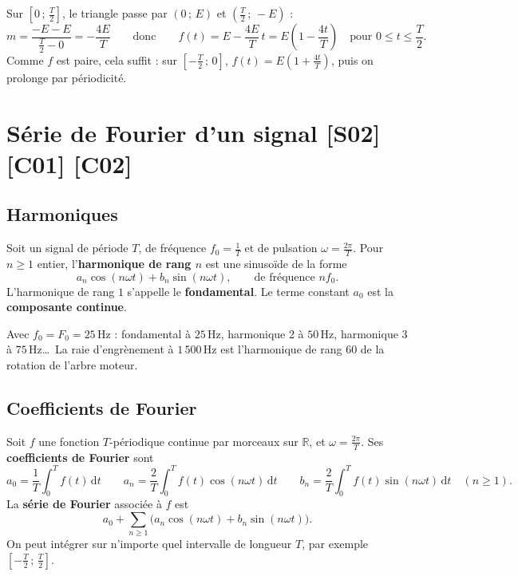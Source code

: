 \documentclass[a4paper,11pt]{article}
\begin{document}
\begin{exemple}\label{ex:triangleexpr}
Sur $\left[0\,;\,\frac T2\right]$, le triangle passe par $(0\,;\,E)$ et $\left(\frac T2\,;\,-E\right)$ :
\[
m = \frac{-E - E}{\frac T2 - 0} = -\frac{4E}{T}
\qquad\text{donc}\qquad
f(t) = E - \frac{4E}{T}\,t = E\left(1 - \frac{4t}{T}\right) \quad\text{pour } 0\leq t\leq\frac T2.
\]
Comme $f$ est paire, cela suffit : sur $\left[-\frac T2\,;\,0\right]$, $f(t) = E\left(1 + \frac{4t}{T}\right)$, puis on prolonge par périodicité.
\end{exemple}

\needspace{7cm}
\section{Série de Fourier d'un signal \hfill {\normalsize\color{uimmred}[S02] [C01] [C02]}}\label{sec:fourier}

\subsection{Harmoniques}\label{subsec:harmoniques}

\begin{definition}
Soit un signal de période $T$, de fréquence $f_0 = \frac1T$ et de pulsation $\omega = \frac{2\pi}{T}$. Pour $n\geq 1$ entier, l'\textbf{harmonique de rang $n$} est une sinusoïde de la forme
\[
a_n\cos(n\omega t) + b_n\sin(n\omega t), \qquad\text{de fréquence } n f_0.
\]
L'harmonique de rang $1$ s'appelle le \textbf{fondamental}. Le terme constant $a_0$ est la \textbf{composante continue}.
\end{definition}

\begin{exemple}
Avec $f_0 = F_0 = 25$\,Hz : fondamental à $25$\,Hz, harmonique 2 à $50$\,Hz, harmonique 3 à $75$\,Hz\dots\ La raie d'engrènement à $1\,500$\,Hz est l'harmonique de rang $60$ de la rotation de l'arbre moteur.
\end{exemple}

\subsection{Coefficients de Fourier}\label{subsec:coefficients}

\begin{definition}\label{def:coefficients}
Soit $f$ une fonction $T$-périodique continue par morceaux sur $\mathbb{R}$, et $\omega = \frac{2\pi}{T}$. Ses \textbf{coefficients de Fourier} sont
\[
\boxed{a_0 = \frac1T\int_0^T f(t)\,\mathrm dt}
\qquad
\boxed{a_n = \frac2T\int_0^T f(t)\cos(n\omega t)\,\mathrm dt}
\qquad
\boxed{b_n = \frac2T\int_0^T f(t)\sin(n\omega t)\,\mathrm dt}
\quad (n\geq 1).
\]
La \textbf{série de Fourier} associée à $f$ est
\[
a_0 + \sum_{n\geq 1}\big(a_n\cos(n\omega t) + b_n\sin(n\omega t)\big).
\]
On peut intégrer sur n'importe quel intervalle de longueur $T$, par exemple $\left[-\frac T2\,;\,\frac T2\right]$.
\end{definition}
\end{document}

